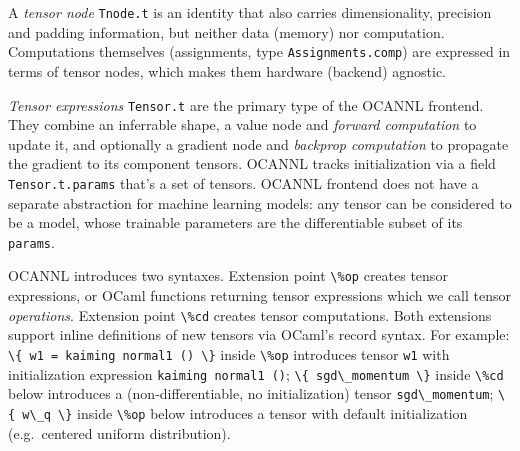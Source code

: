 \documentclass[
  10pt,
  letterpaper,
]{article}
\newcommand{\passthrough}[1]{#1}
\begin{document}
A \emph{tensor node} \passthrough{\lstinline!Tnode.t!} is an identity
that also carries dimensionality, precision and padding information, but
neither data (memory) nor computation. Computations themselves
(assignments, type \passthrough{\lstinline!Assignments.comp!}) are
expressed in terms of tensor nodes, which makes them hardware (backend)
agnostic.

\emph{Tensor expressions} \passthrough{\lstinline!Tensor.t!} are the
primary type of the OCANNL frontend. They combine an inferrable shape, a
value node and \emph{forward computation} to update it, and optionally a
gradient node and \emph{backprop computation} to propagate the gradient
to its component tensors. OCANNL tracks initialization via a field
\passthrough{\lstinline!Tensor.t.params!} that's a set of tensors.
OCANNL frontend does not have a separate abstraction for machine
learning models: any tensor can be considered to be a model, whose
trainable parameters are the differentiable subset of its
\passthrough{\lstinline!params!}.

OCANNL introduces two syntaxes. Extension point
\passthrough{\lstinline!\%op!} creates tensor expressions, or OCaml
functions returning tensor expressions which we call tensor
\emph{operations}. Extension point \passthrough{\lstinline!\%cd!}
creates tensor computations. Both extensions support inline definitions
of new tensors via OCaml's record syntax. For example:
\passthrough{\lstinline!\{ w1 = kaiming normal1 () \}!} inside
\passthrough{\lstinline!\%op!} introduces tensor
\passthrough{\lstinline!w1!} with initialization expression
\passthrough{\lstinline!kaiming normal1 ()!};
\passthrough{\lstinline!\{ sgd\_momentum \}!} inside
\passthrough{\lstinline!\%cd!} below introduces a (non-differentiable,
no initialization) tensor \passthrough{\lstinline!sgd\_momentum!};
\passthrough{\lstinline!\{ w\_q \}!} inside
\passthrough{\lstinline!\%op!} below introduces a tensor with default
initialization (e.g.~centered uniform distribution).
\end{document}
